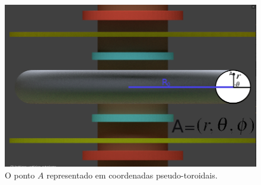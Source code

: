 \documentclass[12pt,oneside,a4paper]{abntex2}
\begin{document}
\begin{figure}[H]
\centering
\includegraphics[scale=0.45]{pseudotoridal2.png}  
\caption{O ponto $A$ representado em coordenadas pseudo-toroidais.}  
\label{fig: btokamak6}
\end{figure}
\end{document}
